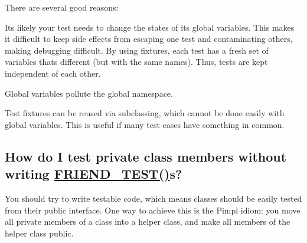 There are several good reasons\+:
\begin{DoxyEnumerate}
\item It\textquotesingle{}s likely your test needs to change the states of its global variables. This makes it difficult to keep side effects from escaping one test and contaminating others, making debugging difficult. By using fixtures, each test has a fresh set of variables that\textquotesingle{}s different (but with the same names). Thus, tests are kept independent of each other.
\end{DoxyEnumerate}
\begin{DoxyEnumerate}
\item Global variables pollute the global namespace.
\end{DoxyEnumerate}
\begin{DoxyEnumerate}
\item Test fixtures can be reused via subclassing, which cannot be done easily with global variables. This is useful if many test cases have something in common.
\end{DoxyEnumerate}

\subsection*{How do I test private class members without writing \hyperlink{gtest__prod_8h_a8d443b4cc1d87a7a17943b8fbdbf3910}{F\+R\+I\+E\+N\+D\+\_\+\+T\+E\+S\+T()}s?}

You should try to write testable code, which means classes should be easily tested from their public interface. One way to achieve this is the Pimpl idiom\+: you move all private members of a class into a helper class, and make all members of the helper class public.

